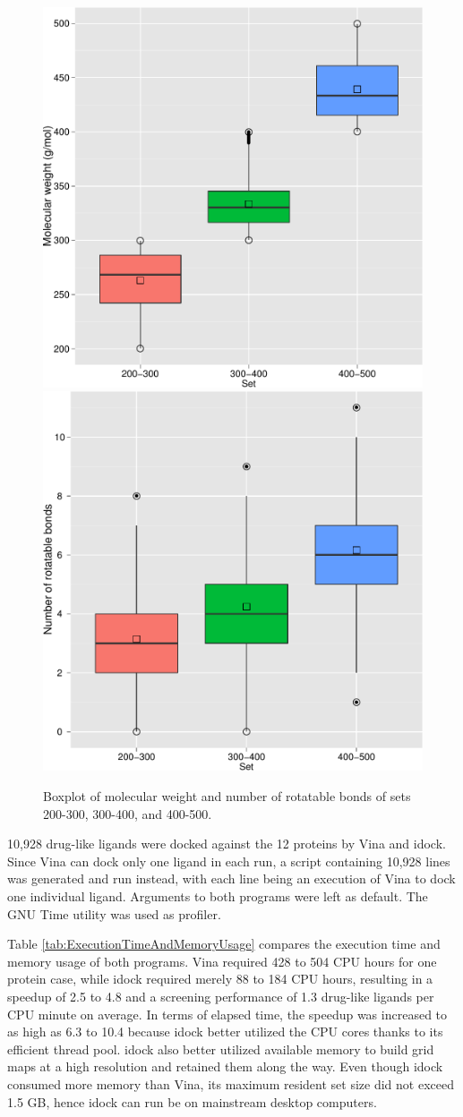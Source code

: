 \documentclass[10pt,conference,compsocconf]{../IEEEtran}
\begin{document}
\begin{figure}
\centering
\subfloat
{
  \includegraphics[width=0.485\linewidth]{MWT.pdf}
}
\subfloat
{
  \includegraphics[width=0.485\linewidth]{NRB.pdf}
}
\caption{Boxplot of molecular weight and number of rotatable bonds of sets 200-300, 300-400, and 400-500.}
\label{MWT-NRB}
\end{figure}

10,928 drug-like ligands were docked against the 12 proteins by Vina and idock. Since Vina can dock only one ligand in each run, a script containing 10,928 lines was generated and run instead, with each line being an execution of Vina to dock one individual ligand. Arguments to both programs were left as default. The GNU Time utility was used as profiler.

Table \ref{tab:ExecutionTimeAndMemoryUsage} compares the execution time and memory usage of both programs. Vina required 428 to 504 CPU hours for one protein case, while idock required merely 88 to 184 CPU hours, resulting in a speedup of 2.5 to 4.8 and a screening performance of 1.3 drug-like ligands per CPU minute on average. In terms of elapsed time, the speedup was increased to as high as 6.3 to 10.4 because idock better utilized the CPU cores thanks to its efficient thread pool. idock also better utilized available memory to build grid maps at a high resolution and retained them along the way. Even though idock consumed more memory than Vina, its maximum resident set size did not exceed 1.5 GB, hence idock can run be on mainstream desktop computers.
\end{document}
